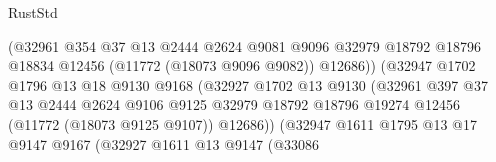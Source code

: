 \begin{lexlean}{RustStd}
\begin{coremodule}
                                        (@32961
                                          @354
                                          @37
                                          @13
                                          @2444
                                          @2624
                                          @9081
                                          @9096
                                          @32979
                                          @18792
                                          @18796
                                          @18834
                                          @12456
                                          (@11772 (@18073 @9096 @9082))
                                          @12686))
                                      (@32947
                                        @1702
                                        @1796
                                        @13
                                        @18
                                        @9130
                                        @9168
                                        (@32927
                                          @1702
                                          @13
                                          @9130
                                          (@32961
                                            @397
                                            @37
                                            @13
                                            @2444
                                            @2624
                                            @9106
                                            @9125
                                            @32979
                                            @18792
                                            @18796
                                            @19274
                                            @12456
                                            (@11772 (@18073 @9125 @9107))
                                            @12686))
                                        (@32947
                                          @1611
                                          @1795
                                          @13
                                          @17
                                          @9147
                                          @9167
                                          (@32927
                                            @1611
                                            @13
                                            @9147
                                            (@33086

\end{coremodule}
\end{lexlean}
